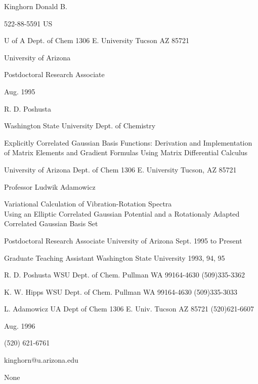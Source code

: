 \documentclass[12pt,thmsa]{article}
\begin{document}
Kinghorn Donald B.

522-88-5591 US

U of A Dept. of Chem 1306 E. University Tucson AZ 85721

University of Arizona

Postdoctoral Research Associate

Aug. 1995

R. D. Poshusta

Washington State University Dept. of Chemistry

\noindent Explicitly Correlated Gaussian Basis Functions: Derivation and
Implementation of Matrix Elements and Gradient Formulas Using Matrix
Differential Calculus

University of Arizona Dept. of Chem 1306 E. University Tucson, AZ 85721

Professor Ludwik Adamowicz

\noindent Variational Calculation of Vibration-Rotation Spectra\\  Using an
Elliptic Correlated Gaussian Potential and a Rotationaly Adapted \\ %
Correlated Gaussian Basis Set

Postdoctoral Research Associate University of Arizona Sept. 1995 to Present

Graduate Teaching Assistant Washington State University 1993, 94, 95

\noindent R. D. Poshusta WSU Dept. of Chem. Pullman WA 99164-4630
(509)335-3362

\noindent K. W. Hipps WSU Dept. of Chem. Pullman WA 99164-4630 (509)335-3033

\noindent L. Adamowicz UA Dept of Chem 1306 E. Univ. Tucson AZ 85721
(520)621-6607

Aug. 1996

(520) 621-6761 

kinghorn@u.arizona.edu

None
\end{document}
